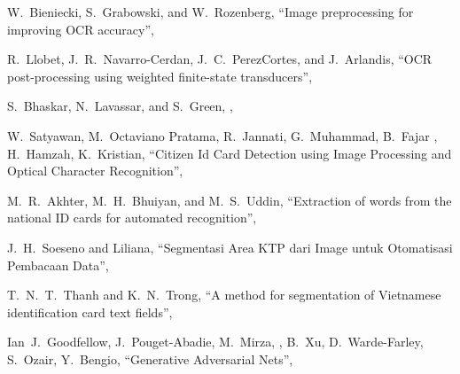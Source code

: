 \documentclass[uplatex, twocolumn,10pt]{jsarticle}
\begin{document}
\begin{thebibliography}{99}
    W.~Bieniecki, S.~Grabowski, and W.~Rozenberg, 
    \newblock “Image preprocessing for improving OCR accuracy”,
    
    R.~Llobet, J.~R.~Navarro-Cerdan, J.~C.~PerezCortes, and J.~Arlandis,
    \newblock “OCR post-processing using weighted finite-state transducers”,
    
    S.~Bhaskar, N.~Lavassar, and S.~Green, 
    ,
    
    W.~Satyawan, M.~Octaviano Pratama, R.~Jannati, G.~Muhammad, B.~Fajar , H.~Hamzah, K.~Kristian,
    \newblock “Citizen Id Card Detection using Image Processing and Optical Character Recognition”,
    
    M.~R.~Akhter, M.~H.~Bhuiyan, and M.~S.~Uddin,
    \newblock “Extraction of words from the national ID cards for automated recognition”,
    
    J.~H.~Soeseno and Liliana,
    \newblock “Segmentasi Area KTP dari Image untuk Otomatisasi Pembacaan Data”,
    
    T.~N.~T.~Thanh and K.~N.~Trong,
    \newblock “A method for segmentation of Vietnamese identification card text fields”,
    
    Ian~J.~Goodfellow, J.~Pouget-Abadie, M.~Mirza, , B.~Xu, D.~Warde-Farley, S.~Ozair, Y.~Bengio,
    \newblock “Generative Adversarial Nets”,
    

\end{thebibliography}
\end{document}
